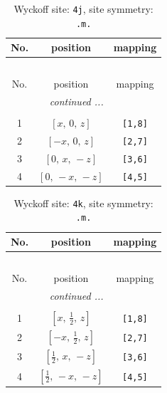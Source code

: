 \documentclass[fleqn,8pt]{jsarticle}
\begin{document}
\renewcommand{\arraystretch}{1.2}
\begin{longtable}{ccc}
\caption{Wyckoff site: {\tt 4j}, site symmetry: {\tt .m.}}
 \\
 \hline \hline
No. & position & mapping \\ \hline \endfirsthead

\multicolumn{2}{l}{\tablename\ \thetable{}} \\
 \hline \hline
No. & position & mapping \\ \hline \endhead

 \hline \hline
\multicolumn{2}{r}{\footnotesize\it continued ...} \\ \endfoot

 \hline \hline
\multicolumn{2}{r}{} \\ \endlastfoot

1 & $\left[ x,\, 0,\, z \right]$ & {\tt [1,8]} \\ \hline
2 & $\left[ - x,\, 0,\, z \right]$ & {\tt [2,7]} \\ \hline
3 & $\left[ 0,\, x,\, - z \right]$ & {\tt [3,6]} \\ \hline
4 & $\left[ 0,\, - x,\, - z \right]$ & {\tt [4,5]} \\
\end{longtable}
\renewcommand{\arraystretch}{1.2}
\begin{longtable}{ccc}
\caption{Wyckoff site: {\tt 4k}, site symmetry: {\tt .m.}}
 \\
 \hline \hline
No. & position & mapping \\ \hline \endfirsthead

\multicolumn{2}{l}{\tablename\ \thetable{}} \\
 \hline \hline
No. & position & mapping \\ \hline \endhead

 \hline \hline
\multicolumn{2}{r}{\footnotesize\it continued ...} \\ \endfoot

 \hline \hline
\multicolumn{2}{r}{} \\ \endlastfoot

1 & $\left[ x,\, \frac{1}{2},\, z \right]$ & {\tt [1,8]} \\ \hline
2 & $\left[ - x,\, \frac{1}{2},\, z \right]$ & {\tt [2,7]} \\ \hline
3 & $\left[ \frac{1}{2},\, x,\, - z \right]$ & {\tt [3,6]} \\ \hline
4 & $\left[ \frac{1}{2},\, - x,\, - z \right]$ & {\tt [4,5]} \\
\end{longtable}
\end{document}
